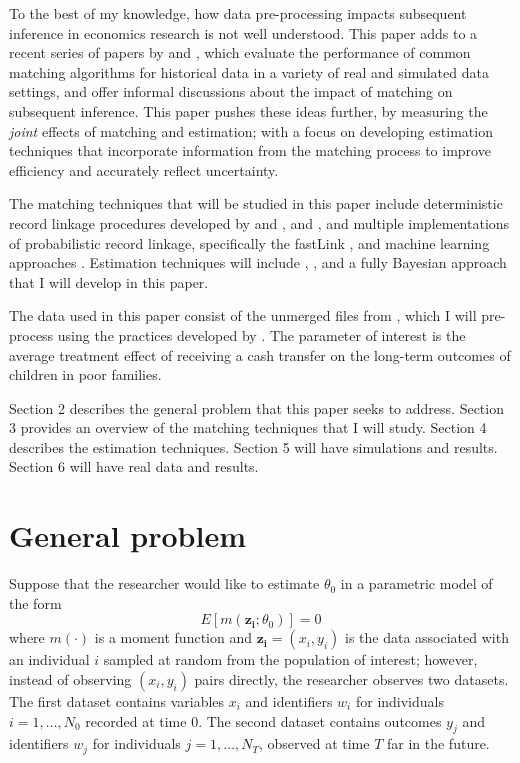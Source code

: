 \documentclass[12pt]{article}
\begin{document}
To the best of my knowledge, how data pre-processing impacts subsequent inference in economics research is not well understood.  This paper adds to a recent series of papers by  \cite{bailey2017} and \cite{arp2018, abe2019}, which evaluate the performance of common matching algorithms for historical data in a variety of real and simulated data settings, and offer informal discussions about the impact of matching on subsequent inference.  This paper pushes these ideas further, by measuring the \textit{joint} effects of matching and estimation; with a focus on developing estimation techniques that incorporate information from the matching process to improve efficiency and accurately reflect uncertainty. 

The matching techniques that will be studied in this paper include deterministic record linkage procedures developed by \cite{ferrie96} and \cite{abe2012, abe2014, abe2017}, and \cite{aizer2016}, and multiple implementations of probabilistic record linkage, specifically the fastLink \cite{enamorado2019}, and machine learning approaches \cite{Feigenbaum2016AML}. Estimation techniques will include \cite{ahl2019}, \cite{lahiri05}, and a fully Bayesian approach that I will develop in this paper. 

The data used in this paper consist of the unmerged files from \cite{aizer2016}, which I will pre-process using the practices developed by \cite{arp2018}.  The parameter of interest is the average treatment effect of receiving a cash transfer on the long-term outcomes of children in poor families.   

Section 2 describes the general problem that this paper seeks to address.  Section 3 provides an overview of the matching techniques that I will study.  Section 4 describes the estimation techniques.  Section 5 will have simulations and results.  Section 6 will have real data and results. 

\section{General problem}
Suppose that the researcher would like to estimate $\theta_0$ in a parametric model of the form
\begin{equation} E[m(\mathbf{z_i}; \theta_0)] = 0 \label{model} \end{equation}
where $m(\cdot)$ is a moment function and $\mathbf{z_i} = (x_i, y_i)$ is the data associated with an individual $i$ sampled at random from the population of interest; however, instead of observing $(x_i, y_i)$ pairs directly, the researcher observes two datasets.  The first dataset contains variables $x_i$ and identifiers $w_i$ for individuals $i = 1, \dots, N_0$ recorded at time 0.  The second dataset contains outcomes $y_j$ and identifiers $w_j$ for individuals $j=1,\dots, N_T$, observed at time $T$ far in the future.  
\end{document}

